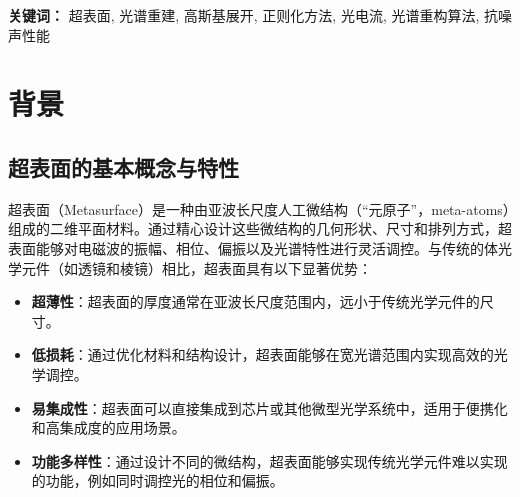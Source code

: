 \documentclass[12pt,hyperref,a4paper,UTF8]{ctexart}
\begin{document}
\cover


\thispagestyle{empty} %
\newpage


\begin{abstract}
本文深入研究了基于超表面的光谱重建技术，
从超表面设计、光谱重建算法到实验分析进行了全面探讨。
首先，设计并仿真了25组不同响应函数的超表面，通过调整光栅参数实现了对不同波长光的高效调控。
其次，采用基于高斯基展开的正则化方法进行光谱重建，
该方法通过将光谱信号表示为高斯基函数的线性组合，
并利用Tikhonov正则化抑制噪声，实现了从压缩信号到光谱分布的有效重建。
实验部分系统分析了采样间隔、光谱特征宽度以及噪声强度等因素对重建效果的影响，
结果表明我们的光谱重建性能为：单峰光谱的分辨率极限约为6nm，双峰光谱的分辨率极限约为40nm，抗噪声极限约为0.7。
研究还指出，宽光谱因频率成分复杂且响应函数数量有限，重建效果不佳。
本研究验证了基于超表面的光谱重建技术的可行性，同时也揭示了其性能边界，
为未来优化超表面设计和改进重建算法提供了重要参考，展示了该技术在生物医学、
环境监测等领域的应用潜力。
\end{abstract}

\begin{flushleft}
\textbf{关键词：} 超表面, 光谱重建, 高斯基展开, 正则化方法, 光电流, 光谱重构算法, 抗噪声性能
\end{flushleft}


\newpage
\tableofcontents

\newpage




\section{背景}
\subsection{超表面的基本概念与特性}
超表面（Metasurface）是一种由亚波长尺度人工微结构（“元原子”，meta-atoms）组成的二维平面材料。通过精心设计这些微结构的几何形状、尺寸和排列方式，超表面能够对电磁波的振幅、相位、偏振以及光谱特性进行灵活调控。与传统的体光学元件（如透镜和棱镜）相比，超表面具有以下显著优势：
\begin{itemize}
    \item \textbf{超薄性}：超表面的厚度通常在亚波长尺度范围内，远小于传统光学元件的尺寸。
    \item \textbf{低损耗}：通过优化材料和结构设计，超表面能够在宽光谱范围内实现高效的光学调控。
    \item \textbf{易集成性}：超表面可以直接集成到芯片或其他微型光学系统中，适用于便携化和高集成度的应用场景。
    \item \textbf{功能多样性}：通过设计不同的微结构，超表面能够实现传统光学元件难以实现的功能，例如同时调控光的相位和偏振。
\end{itemize}
\end{document}
